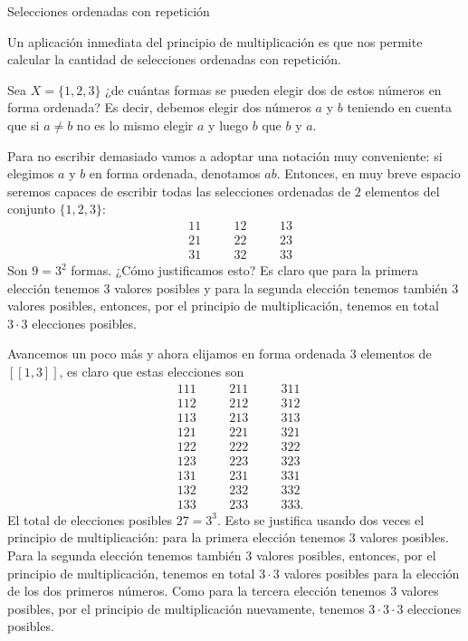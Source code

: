 \begin{section}{Selecciones ordenadas con repetición}\label{sccion-selecciones-ordenadas-con-repeticion}

Un aplicación inmediata del principio de multiplicación  es que nos permite calcular la cantidad de selecciones ordenadas con repetición. 

\begin{ejemplo*} Sea  $X = \{ 1, 2, 3 \}$ ¿de cuántas formas se pueden elegir dos de estos números en forma ordenada?
Es decir, debemos elegir dos números $a$ y $b$ teniendo en cuenta que si $a\not=b$ no es lo mismo elegir $a$ y luego $b$ que $b$ y $a$.  

Para no escribir demasiado vamos a adoptar una notación muy conveniente: si elegimos $a$ y $b$ en forma ordenada, denotamos $ab$. Entonces, en muy breve espacio seremos capaces de escribir todas las selecciones ordenadas de $2$ elementos del  conjunto  $ \{ 1, 2, 3 \}$:
\begin{align*}
&11&\quad &12&\quad &13 \\
&21&\quad &22&\quad &23\\
&31&\quad &32&\quad &33
\end{align*}
Son $9 = 3^2$ formas. ¿Cómo justificamos esto? Es claro que para la primera elección tenemos $3$ valores posibles y para la segunda elección tenemos también $3$ valores posibles, entonces, por el principio de multiplicación, tenemos en total $3\cdot 3$ elecciones posibles.  

Avancemos un poco más y ahora elijamos en forma ordenada $3$ elementos de  $[[ 1 , 3]]$, es claro que estas elecciones son
\begin{align*}
&1 1 1&\quad &211&\quad &311 \\
&1 1 2&\quad & 212&\quad & 312\\
&1 1 3&\quad & 213&\quad & 313\\
&1 2 1&\quad & 221&\quad & 321\\
&1 2 2&\quad & 222&\quad & 322\\
&1 2 3&\quad & 223&\quad & 323\\
&1 3 1&\quad & 231&\quad & 331\\
&1 3 2&\quad & 232&\quad & 332\\
&1 3 3&\quad & 233&\quad & 333.
\end{align*}
El total de elecciones posibles $27 = 3^3$. Esto se justifica usando dos veces el principio de multiplicación: para la primera elección tenemos $3$ va\-lo\-res posibles. Para la segunda elección tenemos también $3$ valores posibles, entonces, por el principio de multiplicación, tenemos en total $3\cdot 3$ va\-lo\-res posibles para la elección de los dos primeros números. Como para la tercera elección tenemos $3$ valores posibles, por el principio de multiplicación nuevamente, tenemos   $3\cdot 3 \cdot 3$ elecciones posibles.


\end{ejemplo*}
\end{section}
